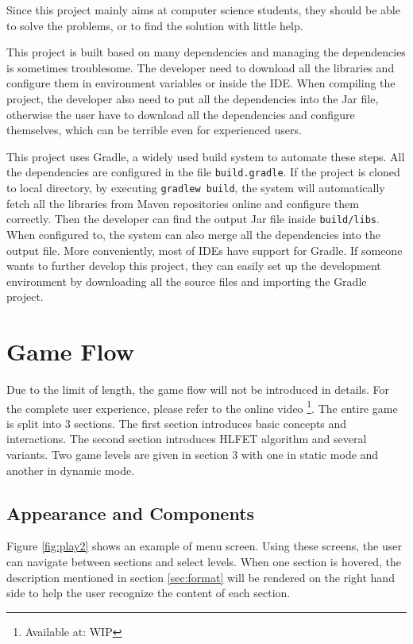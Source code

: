 \documentclass[msc,deptreport, cs]{infthesis}
\begin{document}
Since this project mainly aims at computer science students, they should be able to solve the problems, or to find the solution with little help.

This project is built based on many dependencies and managing the dependencies is sometimes troublesome. The developer need to download all the libraries and configure them in environment variables or inside the IDE. When compiling the project, the developer also need to put all the dependencies into the Jar file, otherwise the user have to download all the dependencies and configure themselves, which can be terrible even for experienced users. 

This project uses Gradle, a widely used build system to automate these steps. All the dependencies are configured in the file \verb+build.gradle+. If the project is cloned to local directory, by executing \verb+gradlew build+, the system will automatically fetch all the libraries from Maven repositories online and configure them correctly. Then the developer can find the output Jar file inside \verb+build/libs+. When configured to, the system can also merge all the dependencies into the output file. More conveniently, most of IDEs have support for Gradle. If someone wants to further develop this project, they can easily set up the development environment by downloading all the source files and importing the Gradle project.

\section{Game Flow}

Due to the limit of length, the game flow will not be introduced in details. For the complete user experience, please refer to the online video \footnote{Available at: WIP}. The entire game is split into 3 sections. The first section introduces basic concepts and interactions. The second section introduces HLFET algorithm and several variants. Two game levels are given in section 3 with one in static mode and another in dynamic mode.

\subsection{Appearance and Components}

Figure \ref{fig:play2} shows an example of menu screen. Using these screens, the user can navigate between sections and select levels. When one section is hovered, the description mentioned in section \ref{sec:format} will be rendered on the right hand side to help the user recognize the content of each section.
\end{document}

